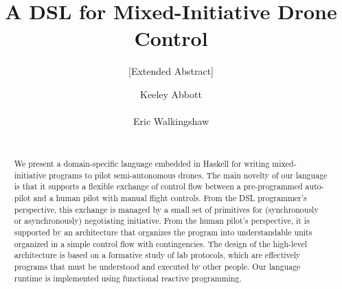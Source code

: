 \documentclass{sig-alternate-05-2015}
\begin{document}




\title{A DSL for Mixed-Initiative Drone Control}
\subtitle{[Extended Abstract]}

\author{
\alignauthor
Keeley Abbott\\
\\
\alignauthor
Eric Walkingshaw\\
\\
}

\maketitle

\begin{abstract}
%
We present a domain-specific language embedded in Haskell for writing
mixed-initiative programs to pilot semi-autono\-mous drones. The main novelty of
our language is that it supports a flexible exchange of control flow between a
pre-programmed auto-pilot and a human pilot with manual flight controls. From
the DSL programmer's perspective, this exchange is managed by a small set of
primitives for (synchronously or asynchronously) negotiating initiative. From
the human pilot's perspective, it is supported by an architecture that
organizes the program into understandable units organized in a simple control
flow with contingencies. The design of the high-level architecture is based on
a formative study of lab protocols, which are effectively programs that must be
understood and executed by other people.
%
Our language runtime is implemented using functional reactive programming.
%
\end{abstract}
\end{document}
